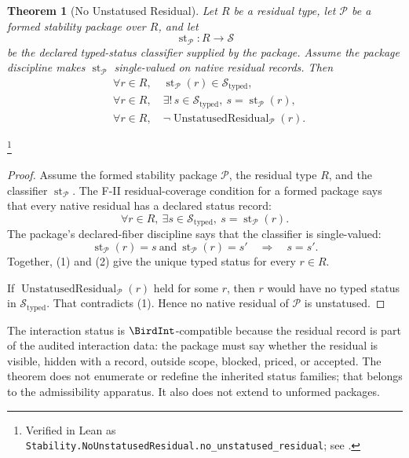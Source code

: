 \documentclass[11pt]{article}
\newtheorem{theorem}{Theorem}[section]
\theoremstyle{definition}
\begin{document}
\begin{theorem}[No Unstatused Residual]\label{thm:F9}
Let \(R\) be a residual type, let \(\mathcal P\) be a formed
stability package over \(R\), and let
\[
  \operatorname{st}_{\mathcal P}:R\longrightarrow\mathcal S
\]
be the declared typed-status classifier supplied by the package.
Assume the package discipline makes \(\operatorname{st}_{\mathcal P}\)
single-valued on native residual records.  Then
\begin{align*}
  &\forall r\in R,\quad
    \operatorname{st}_{\mathcal P}(r)\in
    \mathcal S_{\mathrm{typed}},\\
  &\forall r\in R,\quad
    \exists!\,s\in\mathcal S_{\mathrm{typed}},\
      s=\operatorname{st}_{\mathcal P}(r),\\
  &\forall r\in R,\quad
    \neg\operatorname{UnstatusedResidual}_{\mathcal P}(r).
\end{align*}
\end{theorem}
\footnote{Verified in Lean as
\texttt{Stability.NoUnstatusedResidual.\allowbreak{}no\_unstatused\_residual};
see \Cref{app:formalization}.}
\begin{proof}
Assume the formed stability package \(\mathcal P\), the residual type
\(R\), and the classifier \(\operatorname{st}_{\mathcal P}\).  The
F-II residual-coverage condition for a formed package says that every
native residual has a declared status record:
\[
  \forall r\in R,\ \exists s\in\mathcal S_{\mathrm{typed}},\
  s=\operatorname{st}_{\mathcal P}(r).
  \tag{1}
\]
The package's declared-fiber discipline says that the classifier is
single-valued:
\[
  \operatorname{st}_{\mathcal P}(r)=s
  \ \text{and}\
  \operatorname{st}_{\mathcal P}(r)=s'
  \quad\Longrightarrow\quad
  s=s'.
  \tag{2}
\]
Together, (1) and (2) give the unique typed status for every
\(r\in R\).

If \(\operatorname{UnstatusedResidual}_{\mathcal P}(r)\) held for
some \(r\), then \(r\) would have no typed status in
\(\mathcal S_{\mathrm{typed}}\).  That contradicts (1).  Hence no
native residual of \(\mathcal P\) is unstatused.
\end{proof}

The interaction status is \(\BirdInt\)-compatible because the
residual record is part of the audited interaction data: the package
must say whether the residual is visible, hidden with a record,
outside scope, blocked, priced, or accepted.  The theorem does not
enumerate or redefine the inherited status families; that belongs to
the admissibility apparatus.  It also does not extend to unformed
packages.
\end{document}
